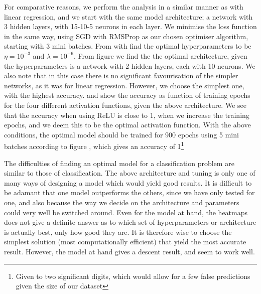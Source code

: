     For comparative reasons, we perform the analysis in a similar manner as with linear regression, and we start with the same model architecture; a network with 3 hidden layers, with 15-10-5 neurons in each layer. We minimise the loss function in the same way, using SGD with RMSProp as our chosen optimiser algorithm, starting with 3 mini batches. From  with find the optimal hyperparameters to be $\eta=10^{-3}$ and $\lambda=10^{-6}$. From figure  we find the the optimal architecture, given the hyperparameters is a network with 2 hidden layers, each with 10 neurons. We also note that in this case there is no significant favourisation of the simpler networks, as it was for linear regression. However, we choose the simplest one, with the highest accuracy.  and  show the accuracy as function of training epochs for the four different activation functions, given the above architecture. We see that the accuracy when using ReLU is close to 1, when we increase the training epochs, and we deem this to be the optimal activation function. With the above conditions, the optimal model should be trained for 900 epochs using 5 mini batches according to figure , which gives an accuracy of 1\footnote{Given to two significant digits, which would allow for a few false predictions given the size of our dataset} 

    The difficulties of finding an optimal model for a classification problem are similar to those of classification. The above architecture and tuning is only one of many ways of designing a model which would yield good results. It is difficult to be adamant that one model outperforms the others, since we have only tested for one, and also because the way we decide on the architecture and parameters could very well be switched around. Even for the model at hand, the heatmaps does not give a definite answer as to which set of hyperparameters or architecture is actually best, only how good they are. It is therefore wise to choose the simplest solution  (most computationally efficient) that yield the most accurate result. However, the model at hand gives a descent result, and seem to work well. 


